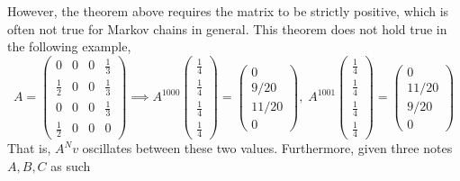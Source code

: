   However, the theorem above requires the matrix to be strictly positive, which is often not true for Markov chains in general. This theorem does not hold true in the following example, 
  \begin{equation}
    A = \begin{pmatrix}
    0&0&0&\frac{1}{3} \\
    \frac{1}{2}&0&0&\frac{1}{3} \\
    0&0&0&\frac{1}{3} \\
    \frac{1}{2}&0&0&0
    \end{pmatrix} \implies A^{1000} 
        \begin{pmatrix}
    \frac{1}{4} \\ \frac{1}{4} \\ \frac{1}{4} \\ \frac{1}{4}
    \end{pmatrix} = 
        \begin{pmatrix}
    0 \\ 9/20 \\ 11/20 \\ 0
    \end{pmatrix}, \; A^{1001} 
        \begin{pmatrix}
    \frac{1}{4} \\ \frac{1}{4} \\\frac{1}{4} \\ \frac{1}{4}
    \end{pmatrix} = 
        \begin{pmatrix}
    0 \\ 11/20 \\ 9/20 \\ 0
    \end{pmatrix}
  \end{equation}
  That is, $A^N v$ oscillates between these two values. Furthermore, given three notes $A, B, C$ as such

